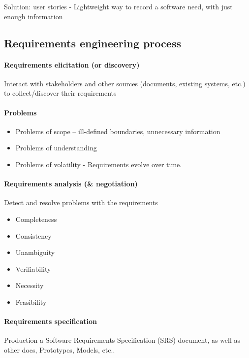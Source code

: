 \documentclass[../ESOF_notes.tex]{subfiles}
\begin{document}
Solution: user stories - Lightweight way to record a software need, with just enough information

\subsection{Requirements engineering process}

\paragraph{Requirements elicitation (or discovery)}

Interact with stakeholders and other sources (documents, existing systems, etc.) to collect/discover their requirements

\paragraph{Problems}

\begin{itemize}
    \item Problems of scope – ill-defined boundaries, unnecessary information
    \item Problems of understanding
    \item Problems of volatility - Requirements evolve over time.
\end{itemize}

\paragraph{Requirements analysis (\& negotiation)}

Detect and resolve problems with the requirements

\begin{itemize}
    \item Completeness
    \item Consistency
    \item Unambiguity
    \item Verifiability
    \item Necessity
    \item Feasibility
\end{itemize}

\paragraph{Requirements specification}
Production a Software Requirements Specification (SRS) document, as well as other docs, Prototypes, Models, etc..
\end{document}

